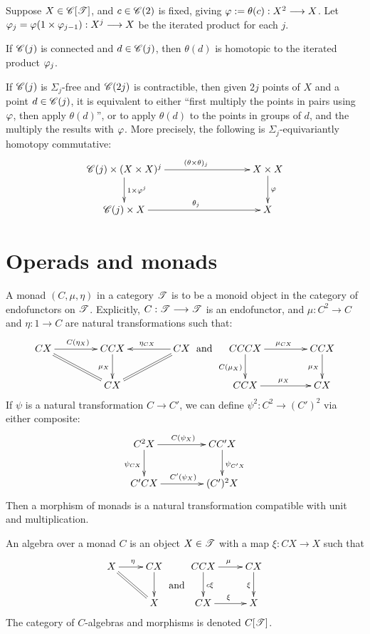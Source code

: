 \documentclass[11pt]{article}
\begin{document}
\begin{lem*}[1.9]
Suppose $X\in\mathscr{C}[\mathscr{T}]$, and $c\in\mathscr{C}(2)$ is fixed, giving 
$\oldphi:=\theta(c):X^2\to X$. Let 
$\oldphi_j=\oldphi(1\times \oldphi_{j-1}):X^j\to X$ be the iterated product 
for each $j$.
\begin{itemise}
\item If $\mathscr{C}(j)$ is connected and $d\in\mathscr{C}(j)$, then $\theta(d)$ is 
homotopic to the iterated product $\oldphi_j$.
\item If $\mathscr{C}(j)$ is $\Sigma_j$-free and $\mathscr{C}(2j)$ is contractible, then given
$2j$ points of $X$ and a point $d\in\mathscr{C}(j)$, it is equivalent to either ``first
multiply the points in pairs using $\oldphi$, then apply $\theta(d)$'', or to apply 
$\theta(d)$ to the points in groups of $d$, and the multiply the results with
$\oldphi$. More precisely, the following is $\Sigma_j$-equivariantly homotopy
commutative:
\[\xymatrix@C=3cm{\scrC(j)\times(X\times X)^j
\ar[r]^{(\theta\times\theta)_j}\ar[d]^{1\times\oldphi^j}&X\times X\ar[d]^\oldphi\\
\scrC(j)\times X\ar[r]^{\theta_j}&X
}\]
\end{itemise}
\end{lem*}
\section{Operads and monads}
A monad $(C,\mu,\eta)$ in a category $\mathscr{T}$ is to be a monoid object in the category of endofunctors on $\mathscr{T}$. Explicitly, $C:\mathscr{T}\longrightarrow\mathscr{T}$ is an endofunctor, and $\mu:C^2\to C$ and $\eta:1\to C$ are natural transformations such that:
\[\xymatrix@C=1.5cm{
CX\ar[r]^{C(\eta_X)}&CCX\ar[d]_{\mu_X}&CX\ar[l]_{\eta_{CX}}\\
&CX\ar@{=}[lu]\ar@{=}[ru]
}
\text{ and }
\xymatrix@C=1.5cm{
CCCX\ar[r]^{\mu_{CX}}\ar[d]_{C(\mu_X)}&CCX\ar[d]_{\mu_X}\\
CCX\ar[r]^{\mu_X}&CX
}
\]
If $\psi$ is a natural transformation $C\to C'$, we can define
$\psi^2:C^2\to (C')^2$ via either composite:
\[\xymatrix@C=1.5cm{
C^2X\ar[d]_{\psi_{CX}}\ar[r]^{C(\psi_X)}&CC'X\ar[d]^{\psi_{C'X}}\\
C'CX\ar[r]^{C'(\psi_X)}&(C')^2X
}\]
Then a morphism of monads is a natural transformation compatible with unit and
multiplication.

An algebra over a monad $C$ is an object $X\in\mathscr{T}$ with a map $\xi:CX\to X$
such that
\[\xymatrix{
X\ar[r]^\eta&CX\ar[d]\\
&X\ar@{=}[lu]
}\raisebox{-.67cm}{\text{ and }}
\xymatrix{
CCX\ar[r]^\mu\ar[d]^{c\xi}&CX\ar[d]_\xi\\
CX\ar[r]^\xi&X
}\]
The category of $C$-algebras and morphisms is denoted $C[\mathscr{T}]$.
\end{document}
